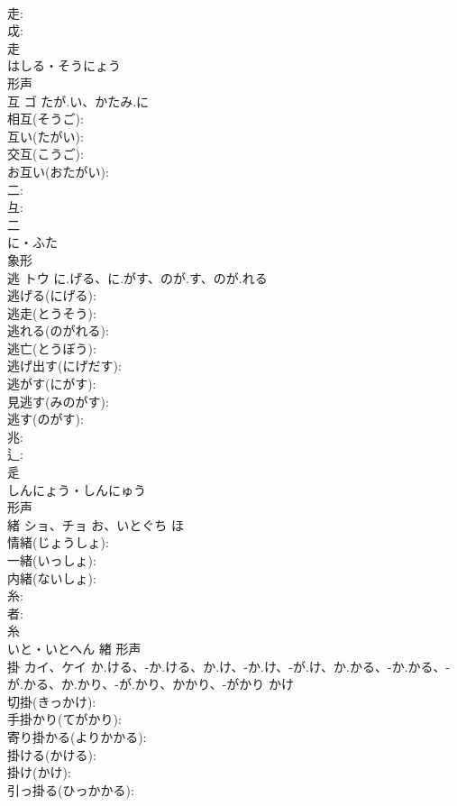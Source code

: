 \documentclass[8pt]{extreport}
\begin{document}
\begin{CJK}{UTF8}{min}
\\	走: 
\\	戉: 
\\	走	
\\	はしる・そうにょう	
\\	形声 
\\	互	ゴ	たが.い、かたみ.に		
\\	相互(そうご): 
\\	互い(たがい): 
\\	交互(こうご): 
\\	お互い(おたがい): 
\\	二: 
\\	彑: 
\\	二	
\\	に・ふた	
\\	象形 
\\	逃	トウ	に.げる、に.がす、のが.す、のが.れる		
\\	逃げる(にげる): 
\\	逃走(とうそう): 
\\	逃れる(のがれる): 
\\	逃亡(とうぼう): 
\\	逃げ出す(にげだす): 
\\	逃がす(にがす): 
\\	見逃す(みのがす): 
\\	逃す(のがす): 
\\	兆: 
\\	辶: 
\\	辵	
\\	しんにょう・しんにゅう	
\\	形声 
\\	緒	ショ、チョ	お、いとぐち	ほ	
\\	情緒(じょうしょ): 
\\	一緒(いっしょ): 
\\	内緒(ないしょ): 
\\	糸: 
\\	者: 
\\	糸	
\\	いと・いとへん	緖	形声 
\\	掛	カイ、ケイ	か.ける、-か.ける、か.け、-か.け、-が.け、か.かる、-か.かる、-が.かる、か.かり、-が.かり、かかり、-がかり	かけ	
\\	切掛(きっかけ): 
\\	手掛かり(てがかり): 
\\	寄り掛かる(よりかかる): 
\\	掛ける(かける): 
\\	掛け(かけ): 
\\	引っ掛る(ひっかかる): 

\end{CJK}
\end{document}
